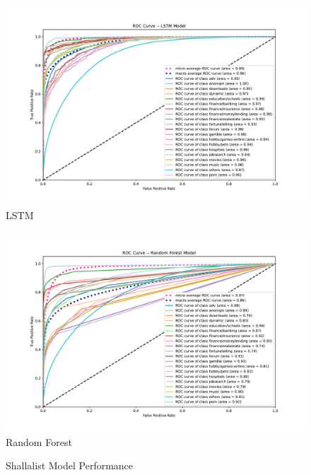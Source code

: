 \documentclass[12pt, letterpaper]{article}
\begin{document}
\begin{figure}[!htb]
\centering
\caption{Shallalist Model Performance}\label{shalla_lstm_rf_svm}
	\begin{minipage}[b]{0.3\textwidth}
	\centering
	\label{toulouse_lstm}
	\includegraphics[width=\textwidth]{figs/roc-shalla-2017-lstm.pdf}\\LSTM
	\end{minipage}
	\begin{minipage}[b]{0.3\textwidth}
	\centering
	\label{toulouse_rf}
	\includegraphics[width=\textwidth]{figs/roc-shalla-2017-rf.pdf}\\Random Forest
	\end{minipage}
	\begin{minipage}[b]{0.3\textwidth}
	\centering
	\label{toulouse_rf}

\end{minipage}
\end{figure}
\end{document}
